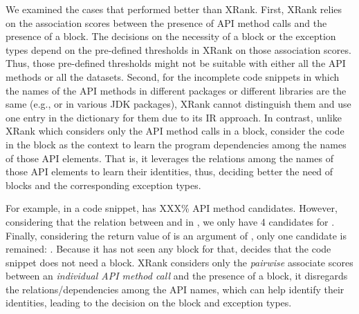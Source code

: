 We examined the cases that {\tool} performed better than XRank.
First, XRank relies on the association scores between the presence of
API method calls and the presence of a  block. The
decisions on the necessity of a  block or the
exception types depend on the pre-defined thresholds in XRank on those
association scores. Thus, those pre-defined thresholds might not be
suitable with either all the API methods or all the datasets. Second,
for the incomplete code snippets in which the names of the API methods
in different packages or different libraries are the same (e.g.,
 or  in various JDK packages), XRank
cannot distinguish them and use one entry in the dictionary for them
due to its IR approach. In contrast, unlike XRank which considers only
the API method calls in a  block, {\tool} consider the
code in the block as the context to learn the program dependencies
among the names of those API elements. That is, it leverages the
relations among the names of those API elements to learn their
identities, thus, deciding better the need of  blocks
and the corresponding exception types.

For example, in a code snippet,  has XXX\% API method
candidates. However, considering that the relation between 
and  in , we only have 4
candidates for . Finally, considering the return value
of  is an argument of , only one
candidate is remained:
.
Because it has not seen any  block for that, {\tool}
decides that the code snippet does not need a  block.
XRank considers only the {\em pairwise} associate scores between an
{\em individual API method call} and the presence of a
 block, it disregards the relations/dependencies among
the API names, which can help identify their identities, leading to
the decision on the  block and exception types.
